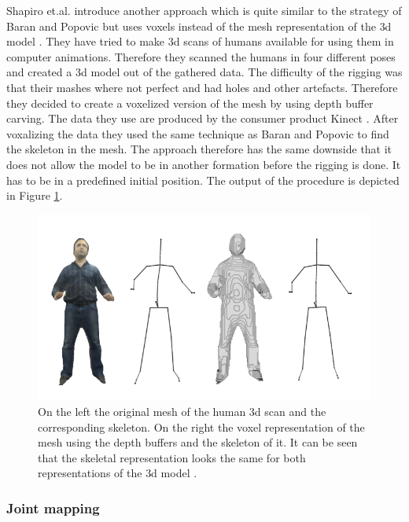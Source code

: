 \newpage
Shapiro et.al. introduce another approach which is quite similar to the strategy of Baran and Popovic but uses voxels instead of the mesh representation of the \gls{3d} model \cite{Shapiro2014RapidSensors}. They have tried to make \gls{3d} scans of humans available for using them in computer animations. Therefore they scanned the humans in four different poses and created a \gls{3d} model out of the gathered data. The difficulty of the rigging was that their mashes where not perfect and had holes and other artefacts. Therefore they decided to create a voxelized version of the mesh by using depth buffer carving. The data they use are produced by the consumer product Kinect \cite{Shapiro2014RapidSensors}. After voxalizing the data they used the same technique as Baran and Popovic \cite{Baran2007} to find the skeleton in the mesh. The approach therefore has the same downside that it does not allow the model to be in another formation before the rigging is done. It has to be in a predefined initial position. The output of the procedure is depicted in Figure \ref{fig:saphiro}.

\begin{figure} [htb!]
    \centering
	\includegraphics[width=13cm]{content/images/saphiro}
	\caption{On the left the original mesh of the human \gls{3d} scan and the corresponding skeleton. On the right the voxel representation of the mesh using the depth buffers and the skeleton of it. It can be seen that the skeletal representation looks the same for both representations of the \gls{3d} model \cite{Shapiro2014RapidSensors}.} 
	\label{fig:saphiro}
\end{figure}

\subsubsection{Joint mapping}


